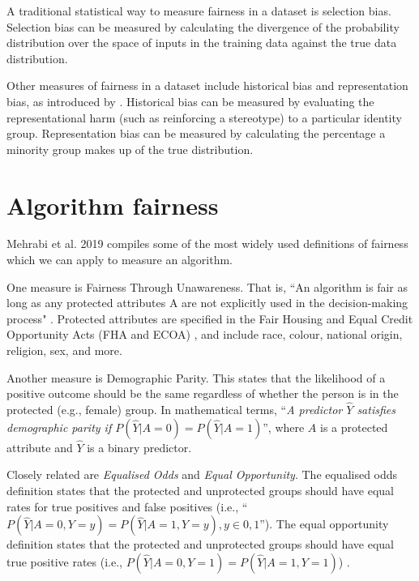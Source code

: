\documentclass{article}
\begin{document}
A traditional statistical way to measure fairness in a dataset is selection bias. Selection bias can be measured by calculating the divergence of the probability distribution over the space of inputs in the training data against the true data distribution.

Other measures of fairness in a dataset include historical bias and representation bias, as introduced by \autocite{DBLP:journals/corr/abs-1901-10002}. Historical bias can be measured by evaluating the representational harm (such as reinforcing a stereotype) to a particular identity group. Representation bias can be measured by calculating the percentage a minority group makes up of the true distribution. 

\section{Algorithm fairness}
Mehrabi et al. 2019 \autocite{DBLP:journals/corr/abs-1908-09635} compiles some of the most widely used definitions of fairness which we can apply to measure an algorithm.

One measure is Fairness Through Unawareness. That is, ``An algorithm is fair as long as any protected attributes A are not explicitly used in the decision-making process" \autocite{GrgicHlaca2016TheCF, NIPS2017_a486cd07}. Protected attributes are specified in the Fair Housing and Equal Credit Opportunity Acts (FHA and ECOA) \autocite{Chen_2019}, and include race, colour, national origin, religion, sex, and more.

Another measure is Demographic Parity. This states that the likelihood of a positive outcome \autocite{10.1145/3194770.3194776} should be the same regardless of whether the person is in the protected (e.g., female) group. In mathematical terms, ``\textit{A predictor $\hat{Y}$ satisfies demographic parity if $P(\hat{Y}|A=0) = P(\hat{Y}|A=1)$}'', where $A$ is a protected attribute and $\hat{Y}$ is a binary predictor.  

Closely related are \textit{Equalised Odds} and \textit{Equal Opportunity}. The equalised odds definition states that the protected and unprotected groups should have equal rates for true positives and false positives (i.e., ``$P(\hat{Y}|A=0, Y=y) = P(\hat{Y}|A=1, Y=y), y \in {0,1}$''). The equal opportunity definition states that the protected and unprotected groups should have equal true positive rates (i.e., $P(\hat{Y}|A=0, Y=1) = P(\hat{Y}|A=1, Y=1)$) \cite{DBLP:journals/corr/HardtPS16}.
\end{document}
